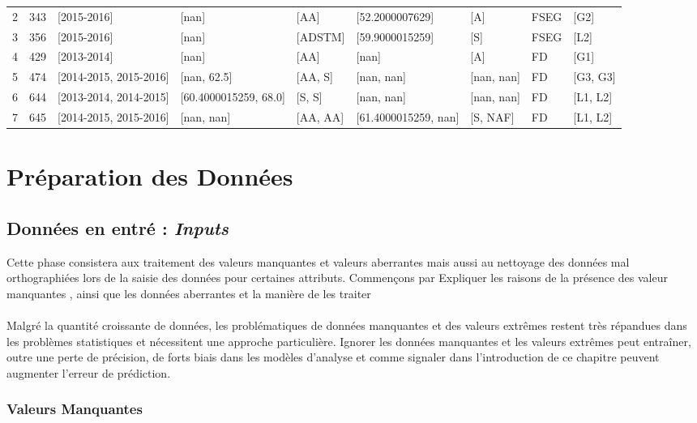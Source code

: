 \begin{table}
\begin{tabular}{lrlllllll}
	2 &  343 &             [2015-2016] &                  [nan] &      [AA] &       [52.2000007629] &         [A] &  FSEG &      [G2] \\
	3 &  356 &             [2015-2016] &                  [nan] &   [ADSTM] &       [59.9000015259] &         [S] &  FSEG &      [L2] \\
	4 &  429 &             [2013-2014] &                  [nan] &      [AA] &                 [nan] &         [A] &    FD &      [G1] \\
	5 &  474 &  [2014-2015, 2015-2016] &            [nan, 62.5] &   [AA, S] &            [nan, nan] &  [nan, nan] &    FD &  [G3, G3] \\
	6 &  644 &  [2013-2014, 2014-2015] &  [60.4000015259, 68.0] &    [S, S] &            [nan, nan] &  [nan, nan] &    FD &  [L1, L2] \\
	7 &  645 &  [2014-2015, 2015-2016] &             [nan, nan] &  [AA, AA] &  [61.4000015259, nan] &    [S, NAF] &    FD &  [L1, L2] \\
	\bottomrule
\end{tabular}
\endgroup
\end{table}
\section{Préparation des Données}
 \subsection{Données en entré  : \emph{Inputs}}
Cette phase consistera aux traitement des valeurs manquantes et valeurs aberrantes mais aussi au nettoyage des données mal orthographiées lors de la saisie des données pour certaines attributs. 
Commençons par  Expliquer les raisons de la présence des valeur manquantes , ainsi que les données aberrantes et la manière de les traiter
\paragraph{}
Malgré la quantité croissante de données, les problématiques de données
manquantes et des valeurs extrêmes restent très répandues dans les
problèmes statistiques et nécessitent une approche particulière. Ignorer
les données manquantes et les valeurs extrêmes peut entraîner, outre une
perte de précision, de forts biais dans les modèles d'analyse et comme
signaler dans l'introduction de ce chapitre peuvent augmenter l'erreur
de prédiction.
\subsubsection{Valeurs Manquantes}
